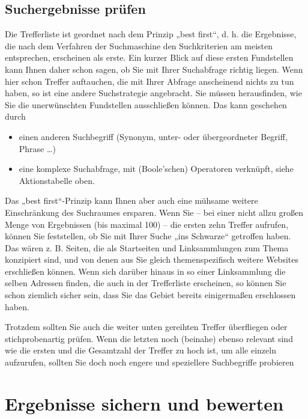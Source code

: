 \documentclass[]{book}
\providecommand{\tightlist}{%
  \setlength{\itemsep}{0pt}\setlength{\parskip}{0pt}}
\theoremstyle{definition}
\theoremstyle{definition}
\theoremstyle{definition}
\theoremstyle{remark}
\begin{document}
\subsection{Suchergebnisse prüfen}\label{suchergebnisse-prufen}

Die Trefferliste ist geordnet nach dem Prinzip „best first``, d. h. die
Ergebnisse, die nach dem Verfahren der Suchmaschine den Suchkriterien am
meisten entsprechen, erscheinen als erste. Ein kurzer Blick auf diese
ersten Fundstellen kann Ihnen daher schon sagen, ob Sie mit Ihrer
Suchabfrage richtig liegen. Wenn hier schon Treffer auftauchen, die mit
Ihrer Abfrage anscheinend nichts zu tun haben, so ist eine andere
Suchstrategie angebracht. Sie müssen herausfinden, wie Sie die
unerwünschten Fundstellen ausschließen können. Das kann geschehen durch

\begin{itemize}
\tightlist
\item
  einen anderen Suchbegriff (Synonym, unter- oder übergeordneter
  Begriff, Phrase \ldots{})
\item
  eine komplexe Suchabfrage, mit (Boole'schen) Operatoren verknüpft,
  siehe Aktionstabelle oben.
\end{itemize}

Das „best first``-Prinzip kann Ihnen aber auch eine mühsame weitere
Einschränkung des Suchraumes ersparen. Wenn Sie -- bei einer nicht allzu
großen Menge von Ergebnissen (bis maximal 100) -- die ersten zehn
Treffer aufrufen, können Sie feststellen, ob Sie mit Ihrer Suche „ins
Schwarze`` getroffen haben. Das wären z. B. Seiten, die als Startseiten
und Linksammlungen zum Thema konzipiert sind, und von denen aus Sie
gleich themenspezifisch weitere Websites erschließen können. Wenn sich
darüber hinaus in so einer Linksammlung die selben Adressen finden, die
auch in der Trefferliste erscheinen, so können Sie schon ziemlich sicher
sein, dass Sie das Gebiet bereits einigermaßen erschlossen haben.

Trotzdem sollten Sie auch die weiter unten gereihten Treffer überfliegen
oder stichprobenartig prüfen. Wenn die letzten noch (beinahe) ebenso
relevant sind wie die ersten und die Gesamtzahl der Treffer zu hoch ist,
um alle einzeln aufzurufen, sollten Sie doch noch engere und speziellere
Suchbegriffe probieren

\section{Ergebnisse sichern und
bewerten}\label{ergebnisse-sichern-und-bewerten}
\end{document}
